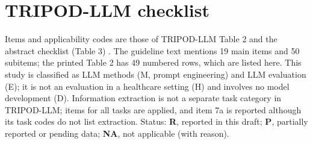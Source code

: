 \section{TRIPOD-LLM checklist}\label{app:tripod}

Items and applicability codes are those of TRIPOD-LLM Table 2 and the abstract checklist (Table 3)
\cite{gallifant2025tripodllm}. The guideline text mentions 19 main items and 50 subitems; the printed Table 2
has 49 numbered rows, which are listed here. This study is classified as LLM methods (M, prompt engineering)
and LLM evaluation (E); it is not an evaluation in a healthcare setting (H) and involves no model
development (D). Information extraction is not a separate task category in TRIPOD-LLM; items for all tasks
are applied, and item 7a is reported although its task codes do not list extraction. Status: \textbf{R},
reported in this draft; \textbf{P}, partially reported or pending data; \textbf{NA}, not applicable (with reason).

